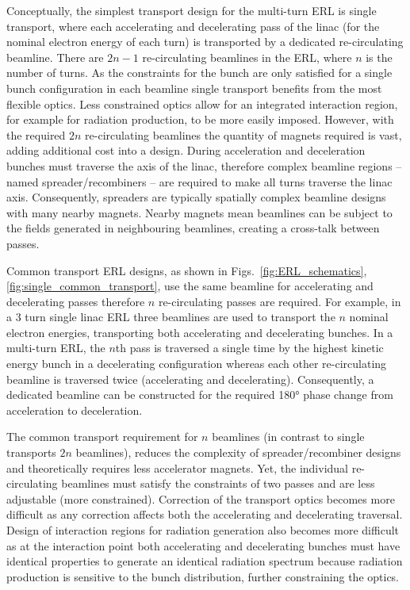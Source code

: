 \documentclass[../main.tex]{subfiles}
\begin{document}
Conceptually, the simplest transport design for the multi-turn ERL is single transport, where each accelerating and decelerating pass of the linac (for the nominal electron energy of each turn) is transported by a dedicated re-circulating beamline. There are $2n-1$  re-circulating beamlines in the ERL, where $n$ is the number of turns. As the constraints for the bunch are only satisfied for a single bunch configuration in each beamline single transport benefits from the most flexible optics. Less constrained optics allow for an integrated interaction region, for example for radiation production, to be more easily imposed. However, with the required $2n$ re-circulating beamlines the quantity of magnets required is vast, adding additional cost into a design. During acceleration and deceleration bunches must traverse the axis of the linac, therefore complex beamline regions -- named spreader/recombiners -- are required to make all turns traverse the linac axis. Consequently, spreaders are typically spatially complex beamline designs with many nearby magnets. Nearby magnets mean beamlines can be subject to the fields generated in neighbouring beamlines, creating a cross-talk between passes.

Common transport ERL designs, as shown in Figs.~\ref{fig:ERL_schematics}, \ref{fig:single_common_transport}, use the same beamline for accelerating and decelerating passes therefore $n$ re-circulating passes are required. For example, in a 3 turn single linac ERL three beamlines are used to transport the $n$ nominal electron energies, transporting both accelerating and decelerating bunches. In a multi-turn ERL, the $n$th pass is traversed a single time by the highest kinetic energy bunch in a decelerating configuration whereas each other re-circulating beamline is traversed twice (accelerating and decelerating). Consequently, a dedicated beamline can be constructed for the required 180\si{\degree} phase change from acceleration to deceleration.

The common transport requirement for $n$ beamlines (in contrast to single transports $2n$ beamlines), reduces the complexity of spreader/recombiner designs and theoretically requires less accelerator magnets. Yet, the individual re-circulating beamlines must satisfy the constraints of two passes and are less adjustable (more constrained). Correction of the transport optics becomes more difficult as any correction affects both the accelerating and decelerating traversal. Design of interaction regions for radiation generation also becomes more difficult as at the interaction point both accelerating and decelerating bunches must have identical properties to generate an identical radiation spectrum because radiation production is sensitive to the bunch distribution, further constraining the optics.
\end{document}
